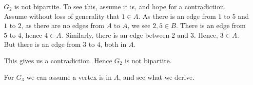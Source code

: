 \documentclass{article}
\begin{document}
\begin{center}
\end{center}

$G_2$ is not bipartite. To see this, assume it is, and hope for a contradiction. Assume without loss of generality that $1 \in A$. As there is an edge from $1$ to $5$ and $1$ to $2$, as there are no edges from $A$ to $A$, we see $2,5 \in B$. There is an edge from $5$ to $4$, hence $4 \in A$. Similarly, there is an edge between $2$ and $3$. Hence, $3 \in A$. But there is an edge from 3 to 4, both in $A$. 

This gives us a contradiction. Hence $G_2$ is not bipartite. 

For $G_3$ we can assume a vertex is in $A$, and see what we derive. 
\end{document}
